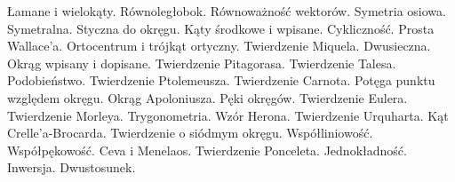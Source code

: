 \documentclass{parchment}
\begin{document}
Łamane i wielokąty.
Równoległobok.
Równoważność wektorów.
Symetria osiowa.
Symetralna.
Styczna do okręgu.
Kąty środkowe i wpisane.
Cykliczność. Prosta Wallace'a.
Ortocentrum i trójkąt ortyczny.
Twierdzenie Miquela.
Dwusieczna. Okrąg wpisany i dopisane.
Twierdzenie Pitagorasa.
Twierdzenie Talesa.
Podobieństwo.
Twierdzenie Ptolemeusza.
Twierdzenie Carnota.
Potęga punktu względem okręgu.
Okrąg Apoloniusza.
Pęki okręgów.
Twierdzenie Eulera.
Twierdzenie Morleya.
Trygonometria. Wzór Herona.
Twierdzenie Urquharta.
Kąt Crelle'a-Brocarda.
Twierdzenie o siódmym okręgu.
Współliniowość.
Współpękowość.
Ceva i Menelaos.
Twierdzenie Ponceleta.
Jednokładność.
Inwersja.
Dwustosunek.

















\end{document}
